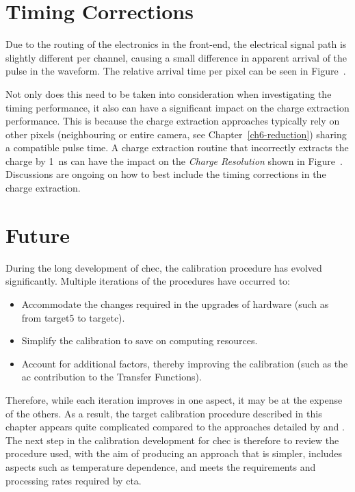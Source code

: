 \section{Timing Corrections} \label{section:timing_corrections}

Due to the routing of the electronics in the front-end, the electrical signal path is slightly different per channel, causing a small difference in apparent arrival of the pulse in the waveform. The relative arrival time per pixel can be seen in Figure~. 

Not only does this need to be taken into consideration when investigating the timing performance, it also can have a significant impact on the charge extraction performance. This is because the charge extraction approaches typically rely on other pixels (neighbouring or entire camera, see Chapter~\ref{ch6-reduction}) sharing a compatible pulse time. A charge extraction routine that incorrectly extracts the charge by \SI{1}{ns} can have the impact on the \textit{Charge Resolution} shown in Figure~. Discussions are ongoing on how to best include the timing corrections in the charge extraction.

\section{Future}

During the long development of \gls{chec}, the calibration procedure has evolved significantly. Multiple iterations of the procedures have occurred to:
\begin{itemize}
	\item Accommodate the changes required in the upgrades of hardware (such as from \gls{target5} to \gls{targetc}).
	\item Simplify the calibration to save on computing resources.
	\item Account for additional factors, thereby improving the calibration (such as the \gls{ac} contribution to the Transfer Functions).
\end{itemize}
Therefore, while each iteration improves in one aspect, it may be at the expense of the others. As a result, the \gls{target} calibration procedure described in this chapter appears quite complicated compared to the approaches detailed by \textcite{Bechtol2012} and \textcite{Albert2017}. The next step in the calibration development for \gls{chec} is therefore to review the procedure used, with the aim of producing an approach that is simpler, includes aspects such as temperature dependence, and meets the requirements and processing rates required by \gls{cta}.
